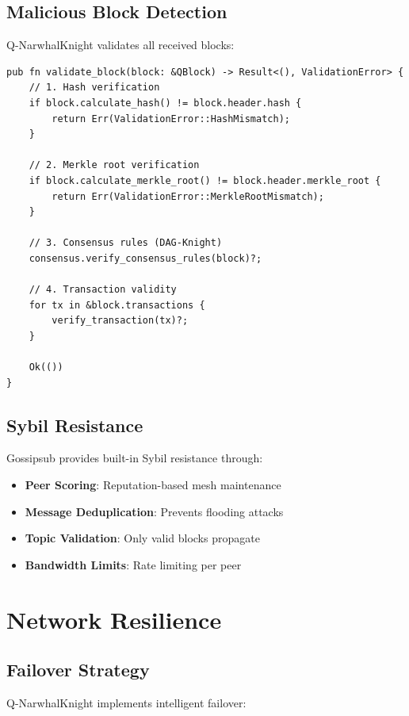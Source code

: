 \documentclass[11pt,a4paper]{article}
\begin{document}
\subsection{Malicious Block Detection}

Q-NarwhalKnight validates all received blocks:

\begin{verbatim}
pub fn validate_block(block: &QBlock) -> Result<(), ValidationError> {
    // 1. Hash verification
    if block.calculate_hash() != block.header.hash {
        return Err(ValidationError::HashMismatch);
    }

    // 2. Merkle root verification
    if block.calculate_merkle_root() != block.header.merkle_root {
        return Err(ValidationError::MerkleRootMismatch);
    }

    // 3. Consensus rules (DAG-Knight)
    consensus.verify_consensus_rules(block)?;

    // 4. Transaction validity
    for tx in &block.transactions {
        verify_transaction(tx)?;
    }

    Ok(())
}
\end{verbatim}

\subsection{Sybil Resistance}

Gossipsub provides built-in Sybil resistance through:

\begin{itemize}
\item \textbf{Peer Scoring}: Reputation-based mesh maintenance
\item \textbf{Message Deduplication}: Prevents flooding attacks
\item \textbf{Topic Validation}: Only valid blocks propagate
\item \textbf{Bandwidth Limits}: Rate limiting per peer
\end{itemize}

\section{Network Resilience}

\subsection{Failover Strategy}

Q-NarwhalKnight implements intelligent failover:
\end{document}
